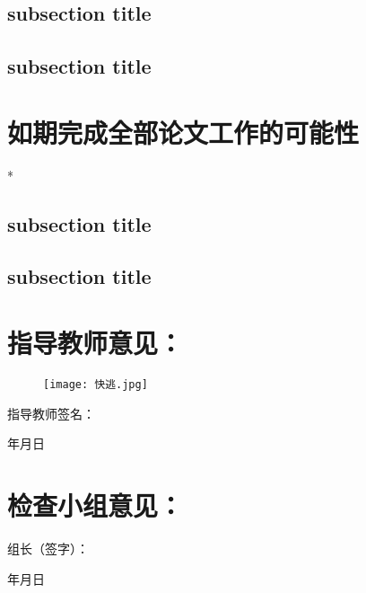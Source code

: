 \subsection{subsection title}
\lipsum[2-3]
\subsection{subsection title}
\lipsum[4-5]

\section{如期完成全部论文工作的可能性}*

\subsection{subsection title}
\lipsum[2-3]
\subsection{subsection title}
\lipsum[4-5]

\clearpage
\section*{指导教师意见：}

\begin{figure}[h]
    \centering
    \texttt{[image: 快逃.jpg]}
\end{figure}

\vspace{24bp}
\hfill 指导教师签名：\hspace{8\ccwd}

\vspace{24bp}
\hfill 年\hspace{2\ccwd}月\hspace{2\ccwd}日

\vspace{24bp}
\section*{检查小组意见：}

\vspace{80bp}
\hfill 组长（签字）：\hspace{8\ccwd}

\vspace{24bp}
\hfill 年\hspace{2\ccwd}月\hspace{2\ccwd}日
